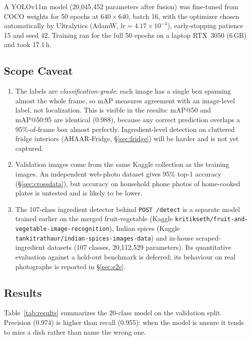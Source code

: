 \documentclass[journal]{IEEEtran}
\begin{document}
A YOLOv11m model (20{,}045{,}452 parameters after fusion) was fine-tuned from COCO
weights for 50 epochs at $640\times640$, batch 16, with the
optimizer chosen automatically by Ultralytics (AdamW,
$\mathrm{lr}=4.17\times10^{-4}$), early-stopping patience 15 and seed
42. Training ran for the full 50 epochs on a laptop RTX~3050 (6\,GB)
and took 17.1\,h.

\subsection{Scope Caveat}

\begin{enumerate}
  \item The labels are \emph{classification-grade}: each image has a
        single box spanning almost the whole frame, so mAP measures
        agreement with an image-level label, not localization. This
        is visible in the results: mAP@50 and mAP@50:95 are
        identical (0.988), because any correct prediction overlaps a
        95\%-of-frame box almost perfectly. Ingredient-level
        detection on cluttered fridge interiors (AHAAR-Fridge,
        \S\ref{sec:fridge}) will be harder and is not yet captured.
  \item Validation images come from the same Kaggle collection as the
        training images. An independent web-photo dataset gives 95\%
        top-1 accuracy (\S\ref{sec:crossdata}), but accuracy on
        household phone photos of home-cooked plates is untested and
        is likely to be lower.
  \item The 107-class ingredient detector behind \texttt{POST
        /detect} is a separate model trained earlier on the merged
        fruit-vegetable (Kaggle
        \texttt{kritikseth/fruit-and-vegetable-image-recognition}),
        Indian spices (Kaggle
        \texttt{tankitrathaur/indian-spices-images-data}) and
        in-house scraped-ingredient datasets (107 classes,
        20{,}112{,}529 parameters). Its quantitative evaluation
        against a held-out benchmark is deferred; its behaviour on
        real photographs is reported in \S\ref{sec:e2e}.
\end{enumerate}

\subsection{Results}

Table~\ref{tab:results} summarizes the 20-class model on the
validation split. Precision (0.974) is higher than recall (0.955):
when the model is unsure it tends to miss a dish rather than name
the wrong one.
\end{document}
